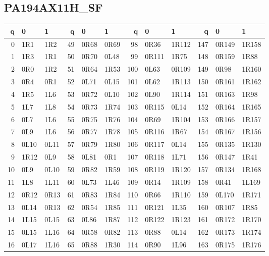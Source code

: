 \subsection*{PA194AX11H\_SF}
\begin{center}
\begingroup\ttfamily\fontsize{9}{10.4}\selectfont
\setlength{\tabcolsep}{4pt}
\begin{tabular}{rll@{\hspace{1.2em}}rll@{\hspace{1.2em}}rll@{\hspace{1.2em}}rll}
\toprule q & 0 & 1 & q & 0 & 1 & q & 0 & 1 & q & 0 & 1\\\midrule
0 & 1R1 & 1R2 & 49 & 0R68 & 0R69 & 98 & 0R36 & 1R112 & 147 & 0R149 & 1R158\\
1 & 1R3 & 1R1 & 50 & 0R70 & 0L48 & 99 & 0R111 & 1R75 & 148 & 0R159 & 1R88\\
2 & 0R0 & 1R2 & 51 & 0R64 & 1R53 & 100 & 0L63 & 0R109 & 149 & 0R98 & 1R160\\
3 & 0R4 & 0R1 & 52 & 0L71 & 0L15 & 101 & 0L62 & 1R113 & 150 & 0R161 & 1R162\\
4 & 1R5 & 1L6 & 53 & 0R72 & 0L10 & 102 & 0L90 & 1R114 & 151 & 0R163 & 1R98\\
5 & 1L7 & 1L8 & 54 & 0R73 & 1R74 & 103 & 0R115 & 0L14 & 152 & 0R164 & 1R165\\
6 & 0L7 & 1L6 & 55 & 0R75 & 1R76 & 104 & 0R69 & 1R104 & 153 & 0R166 & 1R157\\
7 & 0L9 & 1L6 & 56 & 0R77 & 1R78 & 105 & 0R116 & 1R67 & 154 & 0R167 & 1R156\\
8 & 0L10 & 0L11 & 57 & 0R79 & 1R80 & 106 & 0R117 & 0L14 & 155 & 0R135 & 1R130\\
9 & 1R12 & 0L9 & 58 & 0L81 & 0R1 & 107 & 0R118 & 1L71 & 156 & 0R147 & 1R41\\
10 & 0L9 & 0L10 & 59 & 0R82 & 1R59 & 108 & 0R119 & 1R120 & 157 & 0R134 & 1R168\\
11 & 1L8 & 1L11 & 60 & 0L73 & 1L46 & 109 & 0R14 & 1R109 & 158 & 0R41 & 1L169\\
12 & 0R12 & 0R13 & 61 & 0R83 & 1R84 & 110 & 0R66 & 1R110 & 159 & 0L170 & 1R171\\
13 & 0L14 & 0R13 & 62 & 0R54 & 1R85 & 111 & 0R121 & 1L35 & 160 & 0R107 & 1R85\\
14 & 1L15 & 0L15 & 63 & 0L86 & 1R87 & 112 & 0R122 & 1R123 & 161 & 0R172 & 1R170\\
15 & 0L15 & 1L16 & 64 & 0R58 & 0R82 & 113 & 0R88 & 0L14 & 162 & 0R173 & 1R174\\
16 & 0L17 & 1L16 & 65 & 0R88 & 1R30 & 114 & 0R90 & 1L96 & 163 & 0R175 & 1R176\\

\end{tabular}
\end{center}
